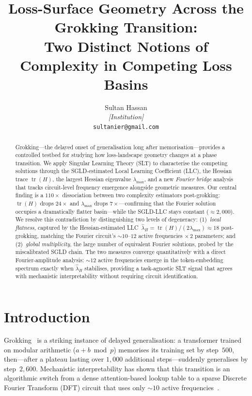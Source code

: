 \documentclass[12pt]{article}
\title{%
  Loss-Surface Geometry Across the Grokking Transition:\\
  Two Distinct Notions of Complexity in Competing Loss Basins%
}
\author{%
  Sultan Hassan\\
  \textit{[Institution]}\\
  \texttt{sultanier@gmail.com}
}
\begin{document}
\maketitle

\begin{abstract}
Grokking—the delayed onset of generalisation long after memorisation—provides
a controlled testbed for studying how loss-landscape geometry changes at a
phase transition.  We apply Singular Learning Theory (SLT) to characterise
the competing solutions through the SGLD-estimated Local Learning Coefficient
(LLC), the Hessian trace $\operatorname{tr}(H)$, the largest Hessian
eigenvalue $\lambda_{\max}$, and a new \emph{Fourier bridge} analysis that
tracks circuit-level frequency emergence alongside geometric measures.  Our
central finding is a $110\times$ dissociation between two complexity
estimators post-grokking: $\operatorname{tr}(H)$ drops $24\times$ and
$\lambda_{\max}$ drops $7\times$—confirming that the Fourier solution
occupies a dramatically flatter basin—while the SGLD-LLC stays constant
($\approx\!2{,}000$).  We resolve this contradiction by distinguishing two
levels of degeneracy: (1)~\emph{local flatness}, captured by the
Hessian-estimated LLC~$\hat\lambda_H = \operatorname{tr}(H)/(2\lambda_{\max})
\approx 18$ post-grokking, matching the Fourier circuit's $\sim\!10$--$12$
active frequencies $\times\,2$ parameters; and (2)~\emph{global
multiplicity}, the large number of equivalent Fourier solutions, probed by
the miscalibrated SGLD chain.  The two measures converge quantitatively with
a direct Fourier-amplitude analysis: $\sim\!12$ active frequencies emerge in
the token-embedding spectrum exactly when $\hat\lambda_H$ stabilises,
providing a task-agnostic SLT signal that agrees with mechanistic
interpretability without requiring circuit identification.
\end{abstract}

\section{Introduction}
\label{sec:intro}

Grokking~\citep{power2022grokking} is a striking instance of delayed
generalisation: a transformer trained on modular arithmetic ($a+b \bmod p$)
memorises its training set by step~$500$, then—after a plateau lasting
over $1{,}000$ additional steps—suddenly generalises by step~$2{,}600$.
Mechanistic interpretability has shown that this transition is an algorithmic
switch from a dense attention-based lookup table to a sparse Discrete Fourier
Transform (DFT) circuit that uses only $\sim\!10$ active
frequencies~\citep{nanda2023progress}.
\end{document}

